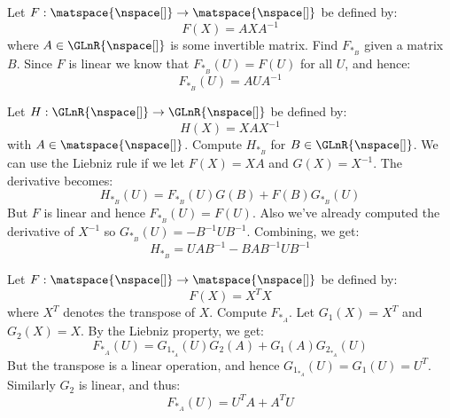         \begin{example}
            Let $F:\matspace{\nspace[]}\rightarrow\matspace{\nspace[]}$
            be defined by:
            \begin{equation}
                F(X)=AXA^{\minus{1}}
            \end{equation}
            where $A\in\GLnR{\nspace[]}$ is some invertible matrix.
            Find $F_{*_{B}}$ given a matrix $B$. Since $F$ is linear we
            know that $F_{*_{B}}(U)=F(U)$ for all $U$, and hence:
            \begin{equation}
                F_{*_{B}}(U)=AUA^{\minus{1}}
            \end{equation}
        \end{example}
        \begin{example}
            Let $H:\GLnR{\nspace[]}\rightarrow\GLnR{\nspace[]}$ be
            defined by:
            \begin{equation}
                H(X)=XAX^{\minus{1}}
            \end{equation}
            with $A\in\matspace{\nspace[]}$. Compute $H_{*_{B}}$ for
            $B\in\GLnR{\nspace[]}$. We can use the Liebniz rule if we
            let $F(X)=XA$ and $G(X)=X^{\minus{1}}$. The derivative
            becomes:
            \begin{equation}
                H_{*_{B}}(U)=F_{*_{B}}(U)G(B)+F(B)G_{*_{B}}(U)
            \end{equation}
            But $F$ is linear and hence $F_{*_{B}}(U)=F(U)$. Also we've
            already computed the derivative of $X^{\minus{1}}$ so
            $G_{*_{B}}(U)=\minus{B}^{\minus{1}}UB^{\minus{1}}$.
            Combining, we get:
            \begin{equation}
                H_{*_{B}}=UAB^{\minus{1}}-BAB^{\minus{1}}UB^{\minus{1}}
            \end{equation}
        \end{example}
        \begin{example}
            Let $F:\matspace{\nspace[]}\rightarrow\matspace{\nspace[]}$
            be defined by:
            \begin{equation}
                F(X)=X^{T}X
            \end{equation}
            where $X^{T}$ denotes the transpose of $X$. Compute
            $F_{*_{A}}$. Let $G_{1}(X)=X^{T}$ and $G_{2}(X)=X$. By the
            Liebniz property, we get:
            \begin{equation}
                F_{*_{A}}(U)=G_{1_{*_{A}}}(U)G_{2}(A)+
                    G_{1}(A)G_{2_{*_{A}}}(U)
            \end{equation}
            But the transpose is a linear operation, and hence
            $G_{1_{*_{A}}}(U)=G_{1}(U)=U^{T}$. Similarly $G_{2}$ is
            linear, and thus:
            \begin{equation}
                F_{*_{A}}(U)=U^{T}A+A^{T}U
            \end{equation}
        \end{example}
